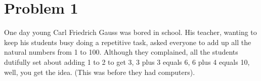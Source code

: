 \documentclass{article}
\begin{document}








\section{Problem 1}

One day young Carl Friedrich Gauss was bored in school.
His teacher, wanting to keep his students busy doing a repetitive
task, asked everyone to add up all the natural numbers from 1 to 100.
Although they complained, all the students dutifully set about
adding 1 to 2 to get 3, 3 plus 3 equals 6, 6 plus 4 equals 10, well,
you get the idea. (This was before they had computers).
\end{document}
